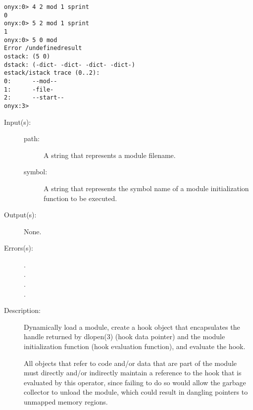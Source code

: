 \begin{description}
\begin{description}
\begin{verbatim}
onyx:0> 4 2 mod 1 sprint
0
onyx:0> 5 2 mod 1 sprint
1
onyx:0> 5 0 mod
Error /undefinedresult
ostack: (5 0)
dstack: (-dict- -dict- -dict- -dict-)
estack/istack trace (0..2):
0:      --mod--
1:      -file-
2:      --start--
onyx:3>
		\end{verbatim}
	\end{description}
\label{systemdict:modload}
\item[{\onyxop{path symbol}{modload}{--}}: ]
	\begin{description}\item[]
	\item[Input(s): ]
		\begin{description}\item[]
		\item[path: ]
			A string that represents a module filename.
		\item[symbol: ]
			A string that represents the symbol name of a
			module initialization function to be executed.
		\end{description}
	\item[Output(s): ] None.
	\item[Errors(s): ]
		\begin{description}\item[]
		\item[.]
		\item[.]
		\item[.]
		\item[.]
		\end{description}
	\item[Description: ]
		Dynamically load a module, create a hook object that
		encapsulates the handle returned by dlopen(3) (hook data
		pointer) and the module initialization function (hook evaluation
		function), and evaluate the hook.

		All objects that refer to code and/or data that are part of the
		module must directly and/or indirectly maintain a reference to
		the hook that is evaluated by this operator, since failing to do
		so would allow the garbage collector to unload the module, which
		could result in dangling pointers to unmapped memory regions.


\end{description}
\end{description}
